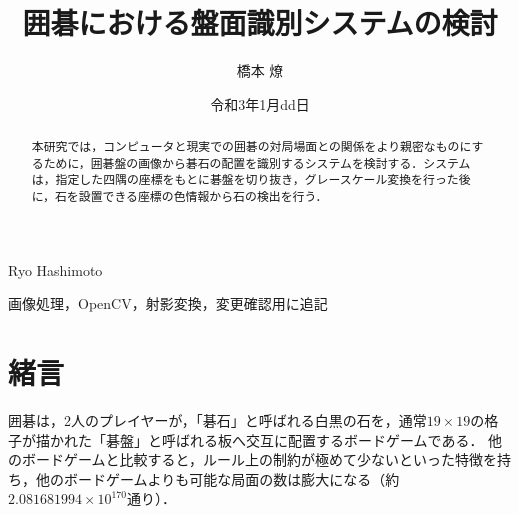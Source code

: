 \documentclass[openright]{nitocs}
\numberwithin{equation}{section}
\begin{document}
    \title{囲碁における盤面識別システムの検討}  %
    \author{橋本 燎}{Ryo Hashimoto} %
    \date{令和3年1月dd日}   %

    \begin{abstract} %
        本研究では，コンピュータと現実での囲碁の対局場面との関係をより親密なものにするために，囲碁盤の画像から碁石の配置を識別するシステムを検討する．システムは，指定した四隅の座標をもとに碁盤を切り抜き，グレースケール変換を行った後に，石を設置できる座標の色情報から石の検出を行う．\\
    \end{abstract}

    \begin{keyword} %
        画像処理，OpenCV，射影変換，変更確認用に追記
    \end{keyword}


    \maketitle

    \section{緒言}  
    \label{sec:format}
        囲碁は，2人のプレイヤーが，「碁石」と呼ばれる白黒の石を，通常$19\times19$の格子が描かれた「碁盤」と呼ばれる板へ交互に配置するボードゲームである．
        他のボードゲームと比較すると，ルール上の制約が極めて少ないといった特徴を持ち，他のボードゲームよりも可能な局面の数は膨大になる（約$2.081681994 \times 10^{170}$通り\cite{numbers}）．
\end{document}
